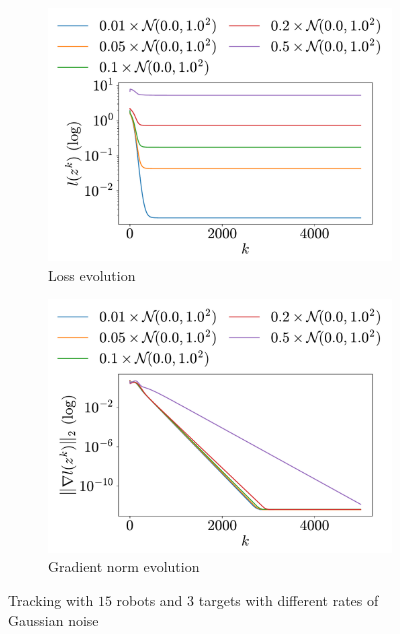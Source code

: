 \documentclass[a4paper,11pt,oneside]{book}
\begin{document}
\begin{figure}[H]
      \centering
      \begin{subfigure}[h]{0.43\linewidth}
            \centering
            \includegraphics[width=\linewidth]{./figs/tracking/rates/loss.pdf} 
            \caption{Loss evolution}
      \end{subfigure}
      \hfill
      \begin{subfigure}[h]{0.43\linewidth}
            \centering
            \includegraphics[width=\linewidth]{./figs/tracking/rates/gradient.pdf} 
            \caption{Gradient norm evolution}
      \end{subfigure}
      \caption{Tracking with $15$ robots and $3$ targets with different rates of Gaussian noise}
      \label{fig:tracking_rates_15_3}
\end{figure}
\end{document}
